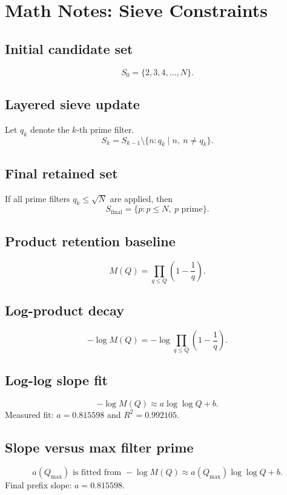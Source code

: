 \documentclass{article}
\begin{document}
\section*{Math Notes: Sieve Constraints}

\subsection*{Initial candidate set}

\[
S_0 = \{2,3,4,\dots,N\}.
\]

\subsection*{Layered sieve update}

Let $q_k$ denote the $k$-th prime filter.
\[
S_k = S_{k-1} \setminus \{n : q_k \mid n,\ n \ne q_k\}.
\]

\subsection*{Final retained set}

If all prime filters $q_k \le \sqrt{N}$ are applied, then
\[
S_{\mathrm{final}} = \{p : p \le N,\ p \text{ prime}\}.
\]

\subsection*{Product retention baseline}

\[
M(Q)=\prod_{q \le Q}\left(1-\frac{1}{q}\right).
\]

\subsection*{Log-product decay}

\[
-\log M(Q) = -\log \prod_{q \le Q}\left(1-\frac{1}{q}\right).
\]

\subsection*{Log-log slope fit}
\[
-\log M(Q) \approx a\log\log Q + b.
\]
Measured fit: $a = 0.815598$ and $R^2 = 0.992105$.
\subsection*{Slope versus max filter prime}
\[
a(Q_{\max}) \text{ is fitted from } -\log M(Q) \approx a(Q_{\max})\log\log Q + b.
\]
Final prefix slope: $a = 0.815598$.
\end{document}
